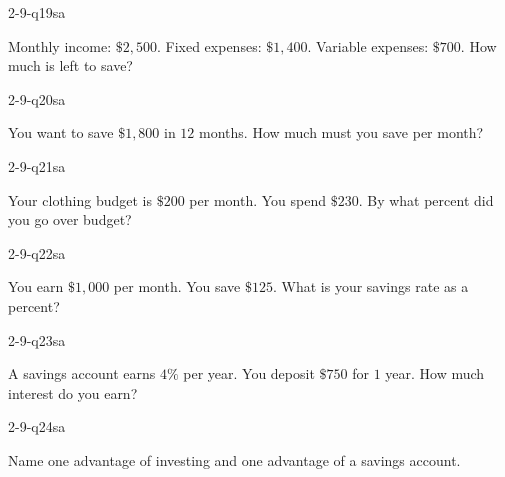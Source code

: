 \begin{practiceQuestion}{2-9-q19}{sa}
\begin{questionText}
Monthly income: $\$2{,}500$. Fixed expenses: $\$1{,}400$. Variable expenses: $\$700$. How much is left to save?
\end{questionText}
\end{practiceQuestion}

\begin{practiceQuestion}{2-9-q20}{sa}
\begin{questionText}
You want to save $\$1{,}800$ in $12$ months. How much must you save per month?
\end{questionText}
\end{practiceQuestion}

\begin{practiceQuestion}{2-9-q21}{sa}
\begin{questionText}
Your clothing budget is $\$200$ per month. You spend $\$230$. By what percent did you go over budget?
\end{questionText}
\end{practiceQuestion}

\begin{practiceQuestion}{2-9-q22}{sa}
\begin{questionText}
You earn $\$1{,}000$ per month. You save $\$125$. What is your savings rate as a percent?
\end{questionText}
\end{practiceQuestion}

\begin{practiceQuestion}{2-9-q23}{sa}
\begin{questionText}
A savings account earns $4\%$ per year. You deposit $\$750$ for $1$ year. How much interest do you earn?
\end{questionText}
\end{practiceQuestion}

\begin{practiceQuestion}{2-9-q24}{sa}
\begin{questionText}
Name one advantage of investing and one advantage of a savings account.
\end{questionText}
\end{practiceQuestion}

